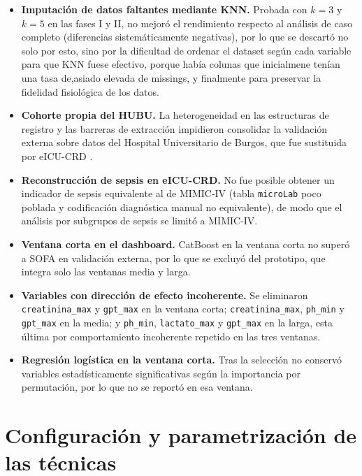 \documentclass[
  spanish,
  a4paper,
  12pt,
  twoside]{memoir}
\begin{document}
\begin{itemize}
  \item \textbf{Imputación de datos faltantes mediante KNN.} Probada con $k=3$ y $k=5$ en las fases I y II, no mejoró el rendimiento respecto al
  análisis de caso completo (diferencias sistemáticamente negativas), por lo que se descartó no solo por esto, sino por la dificultad de ordenar 
  el dataset según cada variable para que KNN fuese efectivo, porque había colunas que inicialmene tenían una tasa de,asiado elevada de missings, y finalmente para preservar la fidelidad 
  fisiológica de los datos.

  \item \textbf{Cohorte propia del HUBU.} La heterogeneidad en las estructuras de registro y las barreras de extracción impidieron consolidar la validación
  externa sobre datos del Hospital Universitario de Burgos, que fue sustituida por eICU-CRD \cite{pollard2018}.

  \item \textbf{Reconstrucción de sepsis en eICU-CRD.} No fue posible obtener un indicador de sepsis equivalente al de MIMIC-IV (tabla \texttt{microLab}
  poco poblada y codificación diagnóstica manual no equivalente), de modo que el análisis por subgrupos de sepsis se limitó a MIMIC-IV.

  \item \textbf{Ventana corta en el dashboard.} CatBoost en la ventana corta no superó a SOFA en validación externa, por lo que se excluyó del prototipo,
  que integra solo las ventanas media y larga.

  \item \textbf{Variables con dirección de efecto incoherente.} Se eliminaron
  \texttt{creatinina\_max} y \texttt{gpt\_max} en la ventana corta;
  \texttt{creatinina\_max}, \texttt{ph\_min} y \texttt{gpt\_max} en la media; y
  \texttt{ph\_min}, \texttt{lactato\_max} y \texttt{gpt\_max} en la larga, esta
  última por comportamiento incoherente repetido en las tres ventanas.

  \item \textbf{Regresión logística en la ventana corta.} Tras la selección no conservó variables estadísticamente significativas según la importancia por
  permutación, por lo que no se reportó en esa ventana.
\end{itemize}

\section{Configuración y parametrización de las técnicas}
\end{document}
